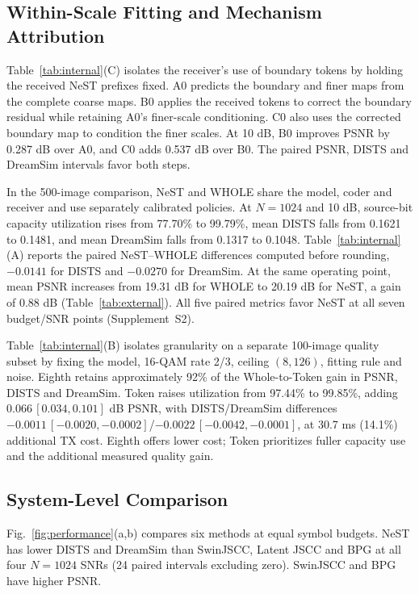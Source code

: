 
\ifCLASSOPTIONonecolumn\else\fi
\subsection{Within-Scale Fitting and Mechanism Attribution}
Table~\ref{tab:internal}(C) isolates the receiver's use of boundary tokens by holding the received NeST prefixes fixed. A0 predicts the boundary and finer maps from the complete coarse maps. B0 applies the received tokens to correct the boundary residual while retaining A0's finer-scale conditioning. C0 also uses the corrected boundary map to condition the finer scales. At 10 dB, B0 improves PSNR by 0.287 dB over A0, and C0 adds 0.537 dB over B0. The paired PSNR, DISTS and DreamSim intervals favor both steps.

In the 500-image comparison, NeST and WHOLE share the model, coder and receiver and use separately calibrated policies. At $N=1024$ and 10 dB, source-bit capacity utilization rises from 77.70\% to 99.79\%, mean DISTS falls from 0.1621 to 0.1481, and mean DreamSim falls from 0.1317 to 0.1048. Table~\ref{tab:internal}(A) reports the paired NeST--WHOLE differences computed before rounding, $-0.0141$ for DISTS and $-0.0270$ for DreamSim. At the same operating point, mean PSNR increases from 19.31 dB for WHOLE to 20.19 dB for NeST, a gain of 0.88 dB (Table~\ref{tab:external}). All five paired metrics favor NeST at all seven budget/SNR points (Supplement~S2).

Table~\ref{tab:internal}(B) isolates granularity on a separate 100-image quality subset by fixing the model, 16-QAM rate 2/3, ceiling $(8,126)$, fitting rule and noise. Eighth retains approximately 92\% of the Whole-to-Token gain in PSNR, DISTS and DreamSim. Token raises utilization from 97.44\% to 99.85\%, adding $0.066\,[0.034,0.101]$ dB PSNR, with DISTS/DreamSim differences $-0.0011\,[-0.0020,-0.0002]$/$-0.0022\,[-0.0042,-0.0001]$, at 30.7 ms (14.1\%) additional TX cost. Eighth offers lower cost; Token prioritizes fuller capacity use and the additional measured quality gain.

\subsection{System-Level Comparison}
\ifCLASSOPTIONonecolumn\fi

Fig.~\ref{fig:performance}(a,b) compares six methods at equal symbol budgets. NeST has lower DISTS and DreamSim than SwinJSCC, Latent JSCC and BPG at all four $N=1024$ SNRs (24 paired intervals excluding zero). SwinJSCC and BPG have higher PSNR.

